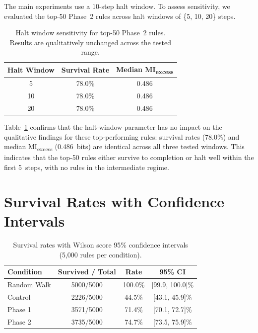 \documentclass[letterpaper]{article}
\begin{document}
The main experiments use a 10-step halt window.  To assess sensitivity,
we evaluated the top-50 Phase~2 rules across halt windows of
\{5, 10, 20\} steps.

\begin{table}[htbp]
\centering
\caption{Halt window sensitivity for top-50 Phase~2 rules.
Results are qualitatively unchanged across the tested range.}
\label{tab:halt_window}
\begin{tabular}{ccc}
\toprule
Halt Window & Survival Rate & Median MI\textsubscript{excess} \\
\midrule
5  & 78.0\% & 0.486 \\
10 & 78.0\% & 0.486 \\
20 & 78.0\% & 0.486 \\
\bottomrule
\end{tabular}
\end{table}

Table~\ref{tab:halt_window} confirms that the halt-window parameter has
no impact on the qualitative findings for these top-performing rules:
survival rates (78.0\%) and median MI\textsubscript{excess} (0.486~bits)
are identical across all three tested windows.  This indicates that the
top-50 rules either survive to completion or halt well within the first
5~steps, with no rules in the intermediate regime.

\section{Survival Rates with Confidence Intervals}
\label{app:survival_ci}

\begin{table}[htbp]
\centering
\caption{Survival rates with Wilson score 95\% confidence intervals
(5{,}000 rules per condition).}
\label{tab:survival_ci}
\begin{tabular}{lccc}
\toprule
Condition & Survived / Total & Rate & 95\% CI \\
\midrule
Random Walk & 5000/5000 & 100.0\% & [99.9, 100.0]\% \\
Control     & 2226/5000 & 44.5\%  & [43.1, 45.9]\% \\
Phase 1     & 3571/5000 & 71.4\%  & [70.1, 72.7]\% \\
Phase 2     & 3735/5000 & 74.7\%  & [73.5, 75.9]\% \\
\bottomrule
\end{tabular}
\end{table}
\end{document}
